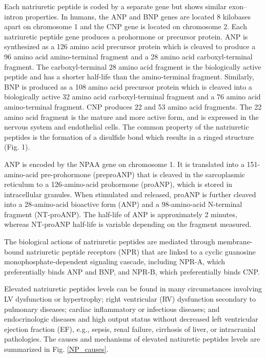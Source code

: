 \documentclass[14pt,a4paper,onecolumn]{extarticle}
\begin{document}
Each natriuretic peptide is coded by a separate gene but shows similar exon–intron properties. In humans, the ANP and
BNP genes are located 8 kilobases apart on chromosome 1
and the CNP gene is located on chromosome 2. Each natriuretic peptide gene produces a prohormone or precursor protein. ANP is synthesized as a 126 amino acid precursor protein which is cleaved to produce a 96 amino acid amino-terminal fragment and a 28 amino acid carboxyl-terminal fragment. The carboxyl-terminal 28 amino acid fragment is the biologically active peptide and has a shorter half-life than the amino-terminal fragment. Similarly, BNP is produced as a 108 amino acid precursor protein which is cleaved into a biologically active 32 amino acid carboxyl-terminal fragment and a 76 amino acid amino-terminal fragment. CNP produces 22 and 53 amino acid fragments. The 22 amino acid fragment is the mature and more active form, and is expressed in the nervous system and endothelial cells. The common property of the natriuretic peptides is the formation of a disulfide bond which results in a ringed structure (Fig. 1).\citep{Suzuki2001}




ANP is encoded by the NPAA gene on chromosome 1. It is translated into a 151-amino-acid pre-prohormone (preproANP) that is cleaved in the sarcoplasmic reticulum to a 126-amino-acid prohormone (proANP), which is stored in intracellular granules.  When stimulated and released, proANP is further cleaved into a 28-amino-acid bioactive form (ANP) and a 98-amino-acid N-terminal fragment (NT-proANP). The half-life of ANP is approximately 2 minutes, whereas NT-proANP half-life is variable depending on the fragment measured. \citep{Maisel2018}



The biological actions of natriuretic peptides are mediated through membrane-bound natriuretic peptide receptors (NPR) that are linked to a cyclic guanosine monophosphate-dependent signaling cascade, including NPR-A, which preferentially binds ANP and BNP, and NPR-B, which preferentially binds CNP.

Elevated natriuretic peptides levels can be found in many circumstances involving LV dysfunction or hypertrophy; right ventricular (RV) dysfunction secondary to pulmonary diseases; cardiac inflammatory or infectious diseases; and endocrinologic diseases and high output status without decreased left ventricular ejection fraction (EF), e.g., sepsis, renal failure, cirrhosis of liver, or intracranial pathologies. The causes and mechanisms of elevated natiuretic peptides levels are summarized in Fig. \ref{NP_causes}. %
\end{document}
